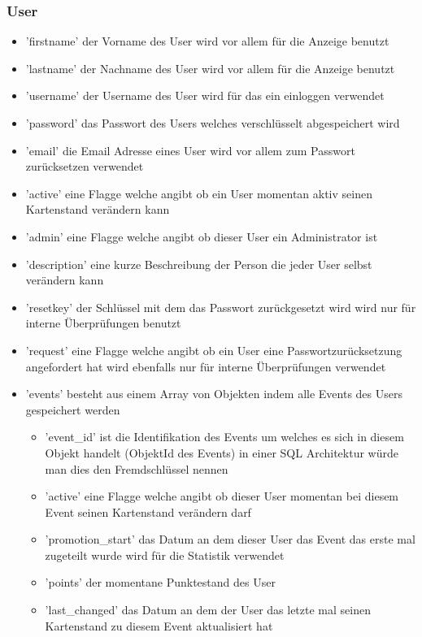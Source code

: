 			\subsubsection{User}
				\begin{itemize}
					\item 'firstname' der Vorname des User wird vor allem für die Anzeige benutzt
					\item 'lastname' der Nachname des User wird vor allem für die Anzeige benutzt
					\item 'username' der Username des User wird für das ein einloggen verwendet
					\item 'password' das Passwort des Users welches verschlüsselt abgespeichert wird
					\item 'email' die Email Adresse eines User wird vor allem zum Passwort zurücksetzen verwendet
					\item 'active' eine Flagge welche angibt ob ein User momentan aktiv seinen Kartenstand verändern kann
					\item 'admin' eine Flagge welche angibt ob dieser User ein Administrator ist
					\item 'description' eine kurze Beschreibung der Person die jeder User selbst verändern kann
					\item 'resetkey' der Schlüssel mit dem das Passwort zurückgesetzt wird wird nur für interne Überprüfungen benutzt
					\item 'request' eine Flagge welche angibt ob ein User eine Passwortzurücksetzung angefordert hat wird ebenfalls nur für interne Überprüfungen verwendet
					\item 'events' besteht aus einem Array von Objekten indem alle Events des Users gespeichert werden
					\begin{itemize}
						\item 'event\_id' ist die Identifikation des Events um welches es sich in diesem Objekt handelt (ObjektId des Events) in einer SQL Architektur würde man dies den Fremdschlüssel nennen
						\item 'active' eine Flagge welche angibt ob dieser User momentan bei diesem Event seinen Kartenstand verändern darf
						\item 'promotion\_start' das Datum an dem dieser User das Event das erste mal zugeteilt wurde wird für die Statistik verwendet
						\item 'points' der momentane Punktestand des User
						\item 'last\_changed' das Datum an dem der User das letzte mal seinen Kartenstand zu diesem Event aktualisiert hat

\end{itemize}
\end{itemize}
